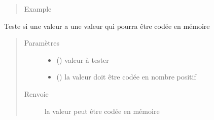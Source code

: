 \documentclass[letterpaper,10pt,french]{sphinxmanual}
\begin{document}
\begin{fulllineitems}
\begin{fulllineitems}
\begin{quote}
\begin{description}
\item[{Example}] \leavevmode
\begin{sphinxVerbatim}[commandchars=\\\{\}]
\end{sphinxVerbatim}

\begin{sphinxVerbatim}[commandchars=\\\{\}]
\end{sphinxVerbatim}

\end{description}\end{quote}

\end{fulllineitems}


\begin{fulllineitems}
\label{\detokenize{processorengine:processorengine.ProcessorEngine.valueFitsInMemory}}
Teste si une valeur a une valeur qui pourra être codée en mémoire
\begin{quote}\begin{description}
\item[{Paramètres}] \leavevmode\begin{itemize}
\item {} 
 () \textendash{} valeur à tester

\item {} 
 () \textendash{} la valeur doit être codée en nombre positif

\end{itemize}

\item[{Renvoie}] \leavevmode
la valeur peut être codée en mémoire


\end{description}
\end{quote}
\end{fulllineitems}
\end{fulllineitems}
\end{document}
